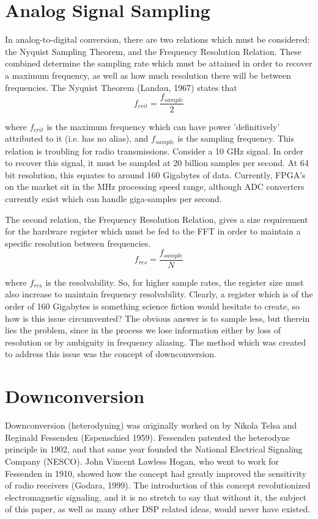 \documentclass{report}
\begin{document}
\section{Analog Signal Sampling}

In analog-to-digital conversion, there are two relations which must be considered: the Nyquist Sampling Theorem, and the Frequency Resolution Relation.  These combined determine the sampling rate which must be attained in order to recover a maximum frequency, as well as how much resolution there will be between frequencies.  The Nyquist Theorem (Landau, 1967) states that
\begin{equation}
f_{crit} = \frac{f_{sample}}{2}
\end{equation}

where $f_{crit}$ is the maximum frequency which can have power 'definitively' attributed to it (i.e. has no alias), and $f_{sample}$ is the sampling frequency.  This relation is troubling for radio transmissions.  Consider a 10 GHz signal.  In order to recover this signal, it must be sampled at 20 billion samples per second.  At 64 bit resolution, this equates to around 160 Gigabytes of data.  Currently, FPGA's on the market sit in the MHz processing speed range, although ADC converters currently exist which can handle giga-samples per second.

The second relation, the Frequency Resolution Relation, gives a size requirement for the hardware register which must be fed to the FFT in order to maintain a specific resolution between frequencies.
\begin{equation}
f_{res} = \frac{f_{sample}}{N}
\end{equation}

where $f_{res}$ is the resolvability.  So, for higher sample rates, the register size must also increase to maintain frequency resolvability.  Clearly, a register which is of the order of 160 Gigabytes is something science fiction would hesitate to create, so how is this issue circumvented? The obvious answer is to sample less, but therein lies the problem, since in the process we lose information either by loss of resolution or by ambiguity in frequency aliasing.  The method which was created to address this issue was the concept of downconversion.

\section{Downconversion}

Downconversion (heterodyning) was originally worked on by Nikola Telsa and Reginald Fessenden (Espenschied 1959).  Fessenden patented the heterodyne principle in 1902, and that same year founded the National Electrical Signaling Company (NESCO).  John Vincent Lawless Hogan, who went to work for Fessenden in 1910, showed how the concept had greatly improved the sensitivity of radio receivers (Godara, 1999).  The introduction of this concept revolutionized electromagnetic signaling, and it is no stretch to say that without it, the subject of this paper, as well as many other DSP related ideas, would never have existed.
\end{document}
